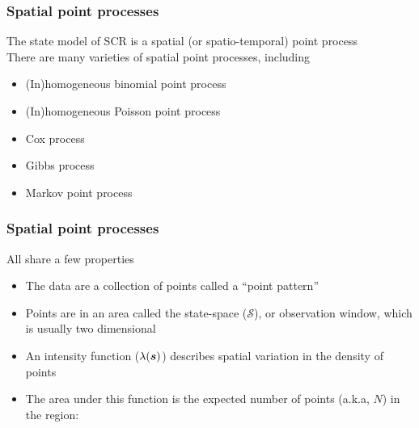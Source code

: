 \documentclass[color=usenames,dvipsnames]{beamer}\usepackage[]{graphicx}\usepackage[]{color}
\begin{document}
\begin{frame}
  \frametitle{Spatial point processes}
  {\centering \large
    The state model of SCR is a spatial (or spatio-temporal) point process \\}
  \vfill
  \pause
  There are many varieties of spatial point processes, including \\
  \begin{itemize}
    \item (In)homogeneous binomial point process
    \item (In)homogeneous Poisson point process
    \item Cox process
    \item Gibbs process
    \item Markov point process
  \end{itemize}
\end{frame}





\begin{frame}
  \frametitle{Spatial point processes}
  All share a few properties \\
  \begin{itemize}%
    \item<1-> The data are a collection of points called a ``point pattern''
    \item<2-> Points are in an area called the state-space
      ($\mathcal{S}$), or observation window, which is usually two
      dimensional  
    \item<3-> An intensity function ($\lambda({\bm s})$) describes spatial
      variation in the density of points
    \item<4-> The area under this function is the expected number of
      points (a.k.a, $N$) in the region:
  \end{itemize}
  \vfill
\end{frame}
\end{document}
